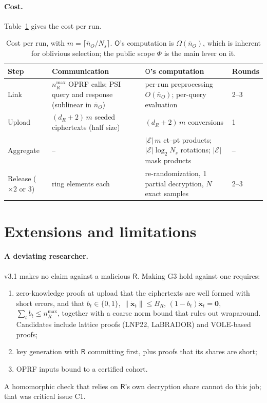 \documentclass[11pt]{article}
\theoremstyle{definition}
\theoremstyle{plain}
\newcommand{\Rp}{\mathsf{R}}
\newcommand{\Op}{\mathsf{O}}
\newcommand{\bxd}{\dot{\mathbf{x}}}
\begin{document}
\paragraph{Cost.} Table~\ref{tab:cost} gives the cost per run.
\begin{table}[h]
\centering\small
\begin{tabularx}{\textwidth}{@{}l>{\raggedright\arraybackslash}X>{\raggedright\arraybackslash}X l@{}}
\toprule
Step & Communication & $\Op$'s computation & Rounds \\
\midrule
Link & $n_R^{\max}$ OPRF calls; PSI query and response (sublinear in $\bar n_O$) & per-run preprocessing $O(\bar n_O)$; per-query evaluation & 2--3 \\
Upload & $(d_R+2)\,m$ seeded ciphertexts (half size) & $(d_R+2)\,m$ conversions & 1 \\
Aggregate & -- & $|\mathcal E|\,m$ ct--pt products; $|\mathcal E|\log_2N_s$ rotations; $|\mathcal E|$ mask products & -- \\
Release ($\times2$ or $3$) & 2 ring elements each & 1 re-randomization, 1 partial decryption, $N$ exact samples & 2--3 \\
\bottomrule
\end{tabularx}
\caption{Cost per run, with $m=\lceil\bar n_O/N_s\rceil$. $\Op$'s computation is $\Omega(\bar n_O)$, which is inherent for oblivious selection; the public scope $\Phi$ is the main lever on it.}\label{tab:cost}
\end{table}

\section{Extensions and limitations}
\label{sec:ext}

\paragraph{A deviating researcher.} v3.1 makes no claim against a malicious $\Rp$. Making G3 hold against one requires:
\begin{enumerate}[nosep,label=(\roman*)]
  \item zero-knowledge proofs at upload that the ciphertexts are well formed with short errors, and that $b_t\in\{0,1\}$, $\|\bxd_t\|\le B_R$, $(1-b_t)\bxd_t=\mathbf0$, $\sum_tb_t\le n_R^{\max}$, together with a coarse norm bound that rules out wraparound. Candidates include lattice proofs (LNP22, LaBRADOR) and VOLE-based proofs;
  \item key generation with $\Rp$ committing first, plus proofs that its shares are short;
  \item OPRF inputs bound to a certified cohort.
\end{enumerate}
A homomorphic check that relies on $\Rp$'s own decryption share cannot do this job; that was critical issue C1.
\end{document}
